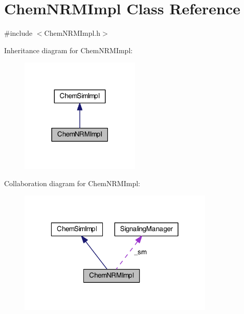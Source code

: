\hypertarget{classChemNRMImpl}{\section{Chem\-N\-R\-M\-Impl Class Reference}
\label{classChemNRMImpl}
}


{\ttfamily \#include $<$Chem\-N\-R\-M\-Impl.\-h$>$}



Inheritance diagram for Chem\-N\-R\-M\-Impl\-:\nopagebreak
\begin{figure}[H]
\begin{center}
\leavevmode
\includegraphics[width=162pt]{classChemNRMImpl__inherit__graph}
\end{center}
\end{figure}


Collaboration diagram for Chem\-N\-R\-M\-Impl\-:\nopagebreak
\begin{figure}[H]
\begin{center}
\leavevmode
\includegraphics[width=265pt]{classChemNRMImpl__coll__graph}
\end{center}
\end{figure}
